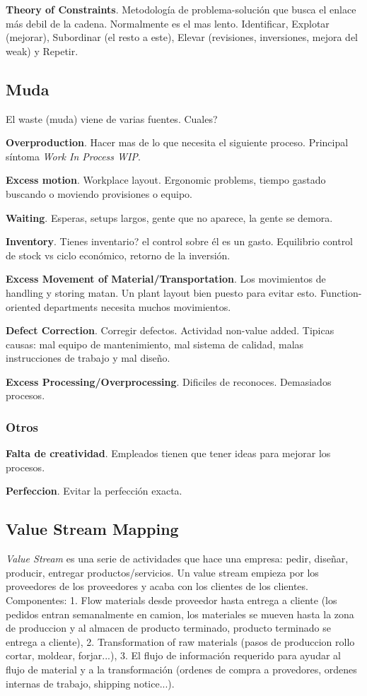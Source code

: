 \documentclass[]{article}
\begin{document}
\textbf{Theory of Constraints}. Metodología de problema-solución que busca el enlace más debil de la cadena. Normalmente es el mas lento. Identificar, Explotar (mejorar), Subordinar (el resto a este), Elevar (revisiones, inversiones, mejora del weak) y Repetir.

\subsection{Muda}

El waste (muda) viene de varias fuentes. Cuales?

\textbf{Overproduction}. Hacer mas de lo que necesita el siguiente proceso. Principal síntoma \textit{Work In Process WIP}.

\textbf{Excess motion}. Workplace layout. Ergonomic problems, tiempo gastado buscando o moviendo provisiones o equipo.

\textbf{Waiting}. Esperas, setups largos, gente que no aparece, la gente se demora. 

\textbf{Inventory}. Tienes inventario? el control sobre él es un gasto. Equilibrio control de stock vs ciclo económico, retorno de la inversión.

\textbf{Excess Movement of Material/Transportation}. Los movimientos de handling y storing matan. Un plant layout bien puesto para evitar esto. Function-oriented departments necesita muchos movimientos.

\textbf{Defect Correction}. Corregir defectos. Actividad non-value added. Tipicas causas: mal equipo de mantenimiento, mal sistema de calidad, malas instrucciones de trabajo y mal diseño. 

\textbf{Excess Processing/Overprocessing}. Dificiles de reconoces. Demasiados procesos. 

\subsubsection{Otros}

\textbf{Falta de creatividad}. Empleados tienen que tener ideas para mejorar los procesos.

\textbf{Perfeccion}. Evitar la perfección exacta. 

\subsection{Value Stream Mapping} 

\textit{Value Stream} es una serie de actividades que hace una empresa: pedir, diseñar, producir, entregar productos/servicios. Un value stream empieza por los proveedores de los proveedores y acaba con los clientes de los clientes. Componentes: 1. Flow materials desde proveedor hasta entrega a cliente (los pedidos entran semanalmente en camion, los materiales se mueven hasta la zona de produccion y al almacen de producto terminado, producto terminado se entrega a cliente), 2. Transformation of raw materials (pasos de produccion rollo cortar, moldear, forjar...), 3. El flujo de información requerido para ayudar al flujo de material y a la transformación (ordenes de compra a provedores, ordenes internas de trabajo, shipping notice...).
\end{document}
